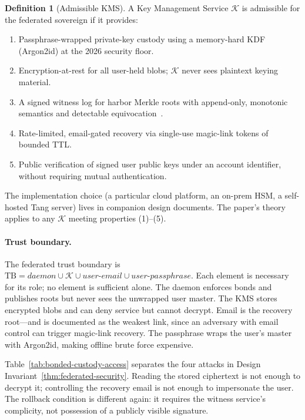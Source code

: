 \documentclass[11pt,a4paper]{article}
\theoremstyle{definition}
\newtheorem{definition}{Definition}[section]
\theoremstyle{remark}
\begin{document}
\begin{definition}[Admissible KMS]\label{def:kms}
\setlength{\parskip}{4pt plus 1pt}
A Key Management Service $\mathcal{K}$ is admissible for the federated sovereign if it provides:
\begin{enumerate}[nosep]
  \item Passphrase-wrapped private-key custody using a memory-hard KDF (Argon2id) at the 2026 security floor.
  \item Encryption-at-rest for all user-held blobs; $\mathcal{K}$ never sees plaintext keying material.
  \item A signed witness log for harbor Merkle roots with append-only, monotonic semantics and detectable equivocation~.
  \item Rate-limited, email-gated recovery via single-use magic-link tokens of bounded TTL.
  \item Public verification of signed user public keys under an account identifier, without requiring mutual authentication.
\end{enumerate}
\end{definition}

The implementation choice (a particular cloud platform, an on-prem HSM, a self-hosted Tang server) lives in companion design documents. The paper's theory applies to any $\mathcal{K}$ meeting properties (1)--(5).

\paragraph{Trust boundary.} The federated trust boundary is
$\mathrm{TB} = \mathit{daemon} \cup \mathcal{K} \cup \mathit{user{\text{-}}email} \cup \mathit{user{\text{-}}passphrase}$.
Each element is necessary for its role; no element is sufficient alone. The daemon enforces bonds and publishes roots but never sees the unwrapped user master. The KMS stores encrypted blobs and can deny service but cannot decrypt. Email is the recovery root---and is documented as the weakest link, since an adversary with email control can trigger magic-link recovery. The passphrase wraps the user's master with Argon2id, making offline brute force expensive.

Table~\ref{tab:bonded-custody-access} separates the four attacks in Design
Invariant~\ref{thm:federated-security}. Reading the stored ciphertext is not
enough to decrypt it; controlling the recovery email is not enough to impersonate
the user. The rollback condition is different again: it requires the witness
service's complicity, not possession of a publicly visible signature.
\end{document}
